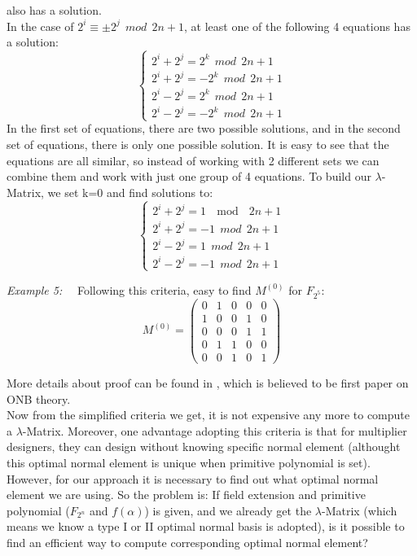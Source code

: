 \documentclass[conference]{IEEEtran}
\begin{document}
also has a solution.\\
In the case of $2^i \equiv \pm 2^j \ \ mod\ \  2n+1$, at least one of the following 4 equations has a solution:
\begin{equation}
\begin{cases}
2^i + 2^j = 2^k \ \ mod \ \ 2n+1\\
2^i + 2^j = -2^k \ \ mod \ \ 2n+1\\
2^i - 2^j = 2^k \ \ mod\ \  2n+1\\
2^i - 2^j = -2^k \ \ mod \ \ 2n+1
\end{cases}
\end{equation}
In the first set of equations, there are two possible solutions, and in the second set of equations,
there is only one possible solution. It is easy to see that the equations are all similar, so instead of 
working with 2 different sets we can combine them and work with just one group of 4 equations. To build 
our $\lambda$-Matrix, we set k=0 and find solutions to:
\begin{equation}
\begin{cases}
2^i + 2^j = 1 \ \mod\ \  2n+1\\
2^i + 2^j = -1 \ \ mod \ \ 2n+1\\
2^i - 2^j = 1 \ \ mod\ \  2n+1\\
2^i - 2^j = -1 \ \ mod \ \ 2n+1
\end{cases}
\end{equation}

\textit{Example 5:} \ \ Following this criteria, easy to find $M^{(0)}$ for $F_{2^5}$:
\begin{equation}
M^{(0)} = \left(
\begin{array}{lcccr}
0 & 1 & 0 & 0 & 0\\
1 & 0 & 0 & 1 & 0\\
0 & 0 & 0 & 1 & 1\\
0 & 1 & 1 & 0 & 0\\
0 & 0 & 1 & 0 & 1
\end{array} \right)
\end{equation}


More details about proof can be found in \cite{ONB}, which is believed to be first paper on ONB theory.\\
Now from the simplified criteria we get, it is not expensive any more to compute a $\lambda$-Matrix.
Moreover, one advantage adopting this criteria is that for multiplier designers, they can design without knowing
specific normal element (althought this optimal normal element is unique when primitive polynomial is set).
However, for our approach it is necessary to find out what optimal normal element we are using.
So the problem is: If field extension and primitive polynomial ($F_{2^n}$ and $f(\alpha)$) is given, and
we already get the $\lambda$-Matrix (which means we know a type I or II optimal normal basis is adopted), is it 
possible to find an efficient way to compute corresponding optimal normal element?
\end{document}
